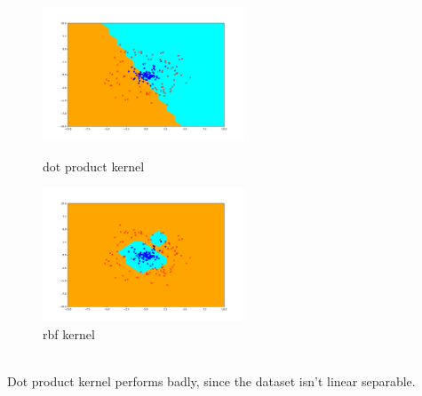 \begin{answer}
    \begin{figure}[htbp]
        \centering
        \begin{minipage}[t]{0.48\textwidth}
            \centering
            \includegraphics[width=6cm]{../src/output/p05_dot_output.pdf}
            \caption{dot product kernel}
        \end{minipage}
        \centering
        \begin{minipage}[t]{0.48\textwidth}
            \centering
            \includegraphics[width=6cm]{../src/output/p05_rbf_output.pdf}
            \caption{rbf kernel}
        \end{minipage}
    \end{figure}\\

    Dot product kernel performs badly, since the dataset isn't linear separable.
\end{answer}

